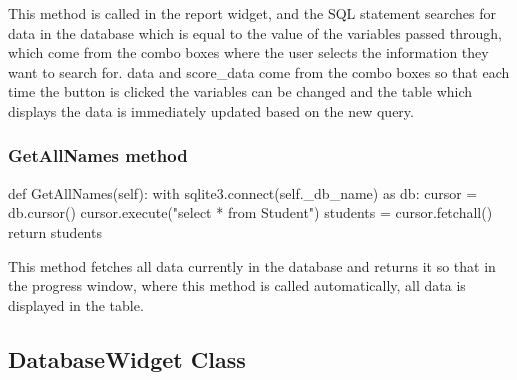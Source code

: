This method is called in the report widget, and the SQL statement searches for data in the database which is equal to the value of the variables passed through, which come from the combo boxes where the user selects the information they want to search for. data and score\_data come from the combo boxes so that each time the button is clicked the variables can be changed and the table which displays the data is immediately updated based on the new query.

\subsubsection{GetAllNames method}

\begin{python}
def GetAllNames(self):
        with sqlite3.connect(self._db_name) as db:
            cursor = db.cursor()
            cursor.execute("select * from Student")
            students = cursor.fetchall()
            return students
\end{python}

This method fetches all data currently in the database and returns it so that in the progress window, where this method is called automatically, all data is displayed in the table.

\subsection{DatabaseWidget Class}

